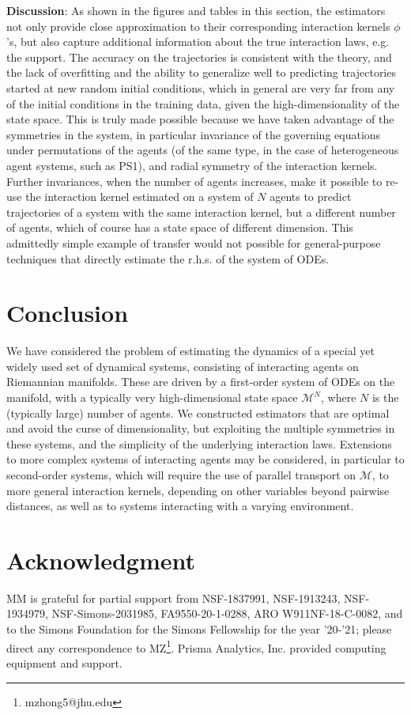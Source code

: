 \documentclass[11pt]{article}
\newcommand{\mM}{\mathcal{M}}
\newcommand{\intkernel}{\phi}
\begin{document}
\textbf{Discussion}: As shown in the figures and tables in this section, the estimators not only provide close approximation to their corresponding interaction kernels $\intkernel$'s, but also capture additional information about the true interaction laws, e.g. the support. The accuracy on the trajectories is consistent with the theory, and the lack of overfitting and the ability to generalize well to predicting trajectories started at new random initial conditions, which in general are very far from any of the initial conditions in the training data, given the high-dimensionality of the state space. This is truly made possible because we have taken advantage of the symmetries in the system, in particular invariance of the governing equations under permutations of the agents (of the same type, in the case of heterogeneous agent systems, such as PS1), and radial symmetry of the interaction kernels. Further invariances, when the number of agents increases, make it possible to re-use the interaction kernel estimated on a system of $N$ agents to predict trajectories of a system with the same interaction kernel, but a different number of agents, which of course has a state space of different dimension. This admittedly simple example of transfer would not possible for general-purpose techniques that directly estimate the r.h.s. of the system of ODEs.
%
\section{Conclusion}
We have considered the problem of estimating the dynamics of a special yet widely used set of dynamical systems, consisting of interacting agents on Riemannian manifolds. 
These are driven by a first-order system of ODEs on the manifold, with a typically very high-dimensional state space $\mM^{N}$, where $N$ is the (typically large) number of agents. 
We constructed estimators that are optimal and avoid the curse of dimensionality, but exploiting the multiple symmetries in these systems, and the simplicity of the underlying interaction laws.
Extensions to more complex systems of interacting agents may be considered, in particular to second-order systems, which will require the use of parallel transport on $\mM$, to more general interaction kernels, depending on other variables beyond pairwise distances, as well as to systems interacting with a varying environment.
%
\section{Acknowledgment}
%
MM is grateful for partial support from NSF-1837991, NSF-1913243, NSF-1934979, NSF-Simons-2031985, FA9550-20-1-0288, ARO W911NF-18-C-0082, and to the Simons Foundation for the Simons Fellowship for the year '20-'21; please direct any correspondence to MZ\footnote{mzhong5@jhu.edu}.   Prisma Analytics, Inc. provided computing equipment and support.
\end{document}
